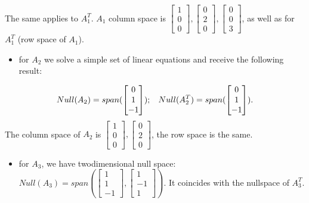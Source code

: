 \documentclass[letterpaper,10pt,english]{jupyterBook}
\begin{document}
\sphinxAtStartPar
The same applies to \(A_1^T\). \(A_1\) column space is \(
\begin{bmatrix}
1\\
0\\
0
\end{bmatrix}
,
\begin{bmatrix}
0\\
2\\
0
\end{bmatrix},
\begin{bmatrix}
0\\
0\\
3
\end{bmatrix}
\), as well as for \(A_1^T\) (row space of \(A_1\)).
\begin{itemize}
\item {} 
\sphinxAtStartPar
for \(A_2\) we solve a simple set of linear equations and receive the following result:

\end{itemize}
\begin{equation*}
\begin{split}Null(A_2) = span(
\begin{bmatrix}
0\\
1\\
-1
\end{bmatrix}
)
; \hspace{3mm} Null(A_2^T) = span(
\begin{bmatrix}
0\\
1\\
-1
\end{bmatrix}
).
\end{split}
\end{equation*}
\sphinxAtStartPar
The column space of \(A_2\) is
\(
\begin{bmatrix}
1\\
0\\
0
\end{bmatrix},
\begin{bmatrix}
0\\
2\\
0
\end{bmatrix}
\), the row space is the same.
\begin{itemize}
\item {} 
\sphinxAtStartPar
for \(A_3\), we have two\sphinxhyphen{}dimensional null space: \(Null(A_3) = span(
\begin{bmatrix}
1\\
1\\
-1
\end{bmatrix},
\begin{bmatrix}
1\\
-1\\
1
\end{bmatrix}
)\). It coincides with the nullspace of \(A_3^T\).

\end{itemize}
\end{document}
